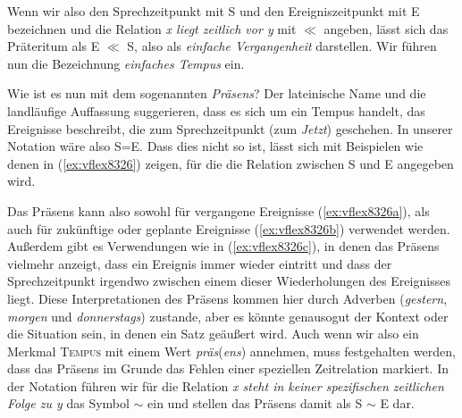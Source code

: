 Wenn wir also den Sprechzeitpunkt mit S und den Ereigniszeitpunkt mit E bezeichnen und die Relation \textit{x liegt zeitlich vor y} mit $\ll$ angeben, lässt sich das Präteritum als E $\ll$ S, also als \textit{einfache Vergangenheit} darstellen.
Wir führen nun die Bezeichnung \textit{einfaches Tempus} ein.


Wie ist es nun mit dem sogenannten \textit{Präsens}?
Der lateinische Name und die landläufige Auffassung suggerieren, dass es sich um ein Tempus handelt, das Ereignisse beschreibt, die zum Sprechzeitpunkt (zum \textit{Jetzt}) geschehen.
In unserer Notation wäre also S=E.
Dass dies nicht so ist, lässt sich mit Beispielen wie denen in (\ref{ex:vflex8326}) zeigen, für die die Relation zwischen S und E angegeben wird.

\begin{exe}
  \ex\label{ex:vflex8326}
  \begin{xlist}
  \end{xlist}
\end{exe}


Das Präsens kann also sowohl für vergangene Ereignisse (\ref{ex:vflex8326a}), als auch für zukünftige oder geplante Ereignisse (\ref{ex:vflex8326b}) verwendet werden.
Außerdem gibt es Verwendungen wie in (\ref{ex:vflex8326c}), in denen das Präsens vielmehr anzeigt, dass ein Ereignis immer wieder eintritt und dass der Sprechzeitpunkt irgendwo zwischen einem dieser Wiederholungen des Ereignisses liegt.
Diese Interpretationen des Präsens kommen hier durch Adverben (\textit{gestern}, \textit{morgen} und \textit{donnerstags}) zustande, aber es könnte genausogut der Kontext oder die Situation sein, in denen ein Satz geäußert wird.
Auch wenn wir also ein Merkmal \textsc{Tempus} mit einem Wert \textit{präs}(\textit{ens}) annehmen, muss festgehalten werden, dass das Präsens im Grunde das Fehlen einer speziellen Zeitrelation markiert.
In der Notation führen wir für die Relation \textit{x steht in keiner spezifischen zeitlichen Folge zu y} das Symbol $\sim$ ein und stellen das Präsens damit als S $\sim$ E dar.

